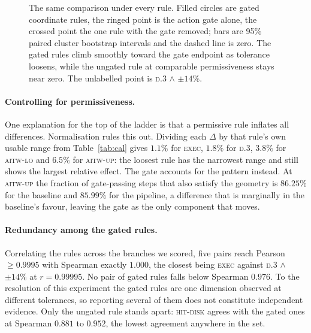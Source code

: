 \documentclass[runningheads,a4paper]{llncs}
\newcommand{\rulename}[1]{\textsc{#1}}
\begin{document}
\begin{figure}[t]
\caption{The same comparison under every rule. Filled circles are gated coordinate rules, the
ringed point is the action gate alone, the crossed point the one rule with the gate removed; bars
are 95\% paired cluster bootstrap intervals and the dashed line is zero. The gated rules climb
smoothly toward the gate endpoint as tolerance loosens, while the ungated rule at comparable
permissiveness stays near zero. The unlabelled point is \rulename{d.3} $\wedge$ $\pm14\%$.}
\label{fig:ladder}
\end{figure}

\paragraph{Controlling for permissiveness.}
One explanation for the top of the ladder is that a permissive rule inflates all differences.
Normalisation rules this out. Dividing each $\Delta$ by that rule's own usable range from
Table~\ref{tab:cal} gives $1.1\%$ for \rulename{exec}, $1.8\%$ for \rulename{d.3}, $3.8\%$ for
\rulename{aitw-lo} and $6.5\%$ for \rulename{aitw-up}: the loosest rule has the narrowest range
and still shows the largest relative effect. The gate accounts for the pattern
instead. At \rulename{aitw-up}
the fraction of gate-passing steps that also satisfy the geometry is $86.25\%$ for the baseline
and $85.99\%$ for the pipeline, a difference that is marginally in the baseline's
favour, leaving the gate as the only component that moves.

\paragraph{Redundancy among the gated rules.}
Correlating the rules across the branches we scored, five pairs reach Pearson $\geq 0.9995$ with
Spearman exactly $1.000$, the closest being \rulename{exec} against \rulename{d.3} $\wedge$
$\pm14\%$ at $r = 0.99995$. No pair of gated rules falls below Spearman $0.976$. To the resolution of
this experiment the gated rules are one dimension observed at different tolerances, so reporting
several of them does not constitute independent evidence. Only the ungated rule stands apart:
\rulename{hit-disk} agrees with the gated ones at Spearman $0.881$ to $0.952$, the lowest
agreement anywhere in the set.
\end{document}
